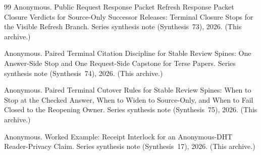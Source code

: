 \documentclass[11pt]{article}
\begin{document}
\begin{thebibliography}{99}
Anonymous.
\newblock Public Request Response Packet Refresh Response Packet Closure Verdicts for Source-Only Successor Releases: Terminal Closure Stops for the Visible Refresh Branch.
\newblock Series synthesis note (Synthesis~73), 2026. (This archive.)

Anonymous.
\newblock Paired Terminal Citation Discipline for Stable Review Spines: One Answer-Side Stop and One Request-Side Capstone for Terse Papers.
\newblock Series synthesis note (Synthesis~74), 2026. (This archive.)

Anonymous.
\newblock Paired Terminal Cutover Rules for Stable Review Spines: When to Stop at the Checked Answer, When to Widen to Source-Only, and When to Fail Closed to the Reopening Owner.
\newblock Series synthesis note (Synthesis~75), 2026. (This archive.)

Anonymous.
\newblock Worked Example: Receipt Interlock for an Anonymous-DHT Reader-Privacy Claim.
\newblock Series synthesis note (Synthesis~17), 2026. (This archive.)

\end{thebibliography}
\end{document}
